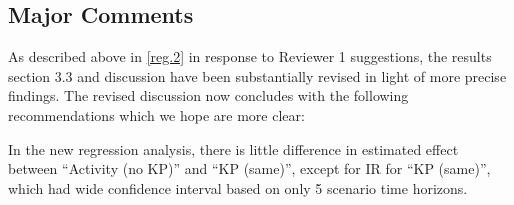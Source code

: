 \subsection{Major Comments}
\begin{comment}\label{recommend}
It's not immediately clear to me what the key recommendation is that flows from Figure 3. If I have a model with the base case (no risk heterogeneity), which compartments or dynamics should I add first better to represent the true epidemic?
\end{comment}
\begin{response}
As described above in \ref{reg.2} in response to Reviewer 1 suggestions, the results section 3.3 and discussion have been
substantially revised in light of more precise findings.
The revised discussion now concludes with the following recommendations which we hope are more clear:
\end{response}
\begin{comment}\label{risk.explain}
Further discussion of the headline finding would be welcome - that the omission of key populations but the inclusion of risk heterogeneity in the generalised population brings about the smallest declines in new HIV infections is notable. Where possible - interrogating which dynamics are most important in the discrepancy between 'Activity (no KP)' and the other three model scenarios would be of interest.
\end{comment}
\begin{response}
In the new regression analysis, there is little difference in estimated effect between ``Activity (no KP)'' and ``KP (same)'',
except for IR for ``KP (same)'', which had wide confidence interval based on only 5 scenario time horizons.
\end{response}
\begin{comment}
Please elaborate on and support Figure C.11 - it's not immediately clear to me that 'the pattern of incidence reduction versus modelled heterogeneity was similar to the pattern of infections averted versus modelled heterogeneity". Recognising that these data do not stem from the same studies, it is noted that in Table C.1 the incidence reduction increases ~2fold between no risk heterogeneity and activity (no KP), whilst averted infections decreases \textasciitilde4 fold. This would appear to be a key difference?
\end{comment}
